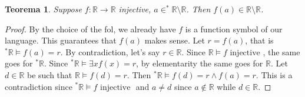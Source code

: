\documentclass[11pt,a4paper]{article}
\newtheorem{theorem}{Teorema}
\theoremstyle{definition}
\theoremstyle{remark}
\begin{document}
\begin{theorem}

	Suppose $f: \mathbb{R} \to \mathbb{R}$ injective, $a \in ^{*}\mathbb{R} \setminus \mathbb{R}$. Then $f(a) \in \mathbb{R} \setminus \mathbb{R}$.

\end{theorem}

\begin{proof}

	By the choice of the fol, we already have $f$ is a function symbol of our language. This guarantees that $f(a)$ makes sense.
	Let $r = f(a)$, that is $^{*} \mathbb{R} \models f(a) = r$. By contradiction, let's say $r \in \mathbb{R}$.
	Since $\mathbb{R} \models f \text{ injective }$, the same goes for $^{*} \mathbb{R}$.
	Since $^{*}\mathbb{R} \models \exists x f(x) = r$, by elementarity the same goes for $\mathbb{R}$.
	Let $d \in \mathbb{R}$ be such that $\mathbb{R} \models f(d) = r$.
	Then $^{*}\mathbb{R} \models f(d) = r \land f(a) = r$. This is a contradiction since $^{*}\mathbb{R} \models f \text{ injective }$ and 
	$a \not = d$ since $a \not \in \mathbb{R}$ while $d \in \mathbb{R}$.

\end{proof}
\end{document}
